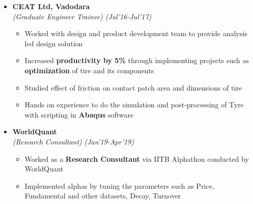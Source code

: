 \documentclass[a4paper,10pt]{article}
\begin{document}
\begin{itemize}%

\item \textbf{CEAT Ltd, Vadodara}\\
\emph{(Graduate Engineer Trainee)} \hfill \emph{(Jul'16-Jul'17)}
	\begin{itemize}[noitemsep,nolistsep]
	\item Worked with design and product development team to provide analysis led design solution
	\item Increased \textbf{productivity by 5\%} through implementing projects such as \textbf{optimization} of tire and its components
	\item Studied effect of friction on contact patch area and dimensions of tire
	\item Hands on experience to do the simulation and post-processing of Tyre with scripting in \textbf{Abaqus} software
    \end{itemize}
    
\item \textbf{WorldQuant} \\
\emph{(Research Consultant)} \hfill \emph{(Jan'19-Apr'19)}
	\begin{itemize}[noitemsep,nolistsep]
    \item Worked as a \textbf{Research Consultant} via IITB Alphathon conducted by WorldQuant
    \item Implemented alphas by tuning the parameters such as Price, Fundamental and other datasets, Decay, Turnover
	\end{itemize}
\end{itemize}
\end{document}

